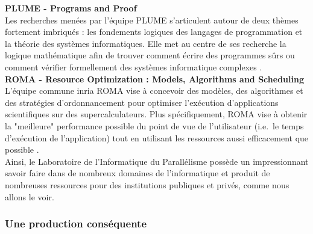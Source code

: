 \textbf{PLUME - Programs and Proof}\\
Les recherches menées par l'équipe PLUME s'articulent autour de deux thèmes fortement imbriqués : les fondements logiques des langages de programmation et la théorie des systèmes informatiques. Elle met au centre de ses recherche la logique mathématique afin de trouver comment écrire des programmes sûrs ou comment vérifier formellement des systèmes informatique complexes \cite{plume}.\\

\textbf{ROMA - Resource Optimization : Models, Algorithms and Scheduling}
L'équipe commune \gls{inria} ROMA vise à concevoir des modèles, des algorithmes et des stratégies d'ordonnancement pour optimiser l'exécution d'applications scientifiques sur des supercalculateurs. Plus spécifiquement, ROMA vise à obtenir la "meilleure" performance possible du point de vue de l'utilisateur (i.e.\ le temps d'exécution de l'application) tout en utilisant les ressources aussi efficacement que possible \cite{roma}.\\

Ainsi, le Laboratoire de l'Informatique du Parallélisme possède un impressionnant savoir faire dans de nombreux domaines de l'informatique et produit de nombreuses ressources pour des institutions publiques et privés, comme nous allons le voir.

\subsubsection{Une production conséquente}
